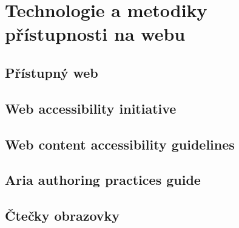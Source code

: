 \chapter{Technologie a metodiky přístupnosti na webu}

\section{Přístupný web}

\section{Web accessibility initiative}

\section{Web content accessibility guidelines}

\section{Aria authoring practices guide}

\section{Čtečky obrazovky}
